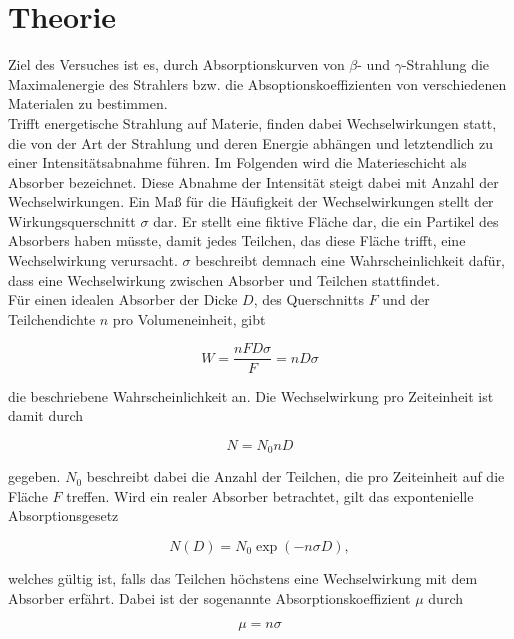 \section{Theorie}
\label{sec:Theorie}

Ziel des Versuches ist es, durch Absorptionskurven von $\beta$- und $\gamma$-Strahlung 
die Maximalenergie des Strahlers bzw. die Absoptionskoeffizienten von verschiedenen
Materialen zu bestimmen.\\

Trifft energetische Strahlung auf Materie, finden dabei Wechselwirkungen statt, die 
von der Art der Strahlung und deren Energie abhängen und letztendlich zu einer
Intensitätsabnahme führen. Im Folgenden wird die Materieschicht als Absorber bezeichnet.
Diese Abnahme der Intensität steigt dabei mit Anzahl der Wechselwirkungen.
Ein Maß für die Häufigkeit der Wechselwirkungen stellt der Wirkungsquerschnitt $\sigma$
dar. Er stellt eine fiktive Fläche dar, die ein Partikel des Absorbers haben müsste,
damit jedes Teilchen, das diese Fläche trifft, eine Wechselwirkung verursacht. $\sigma$
beschreibt demnach eine Wahrscheinlichkeit dafür, dass eine Wechselwirkung zwischen
Absorber und Teilchen stattfindet. \\
Für einen idealen Absorber der Dicke $D$, des Querschnitts $F$ und der Teilchendichte
$n$ pro Volumeneinheit, gibt 

\begin{equation*}
W = \frac{nFD\sigma}{F} = nD\sigma 
\end{equation*}

die beschriebene Wahrscheinlichkeit an. Die Wechselwirkung pro Zeiteinheit 
ist damit durch

\begin{equation*}
N = N_0 n D
\end{equation*}

gegeben. $N_0$ beschreibt dabei die Anzahl der Teilchen, die pro Zeiteinheit auf
die Fläche $F$ treffen. Wird ein realer Absorber betrachtet, gilt das 
expontenielle Absorptionsgesetz 

\begin{equation*}
N(D) = N_0 \exp{\left(-n \sigma D\right)},
\end{equation*}

welches gültig ist, falls das Teilchen höchstens eine Wechselwirkung mit 
dem Absorber erfährt. Dabei ist der sogenannte Absorptionskoeffizient $\mu$
durch 

\begin{equation*}
\mu = n \sigma
\end{equation*}

